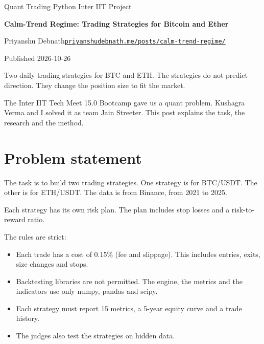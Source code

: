 \documentclass[11pt,a4paper]{article}
\begin{document}
\thispagestyle{plain}
\begin{flushleft}
{\footnotesize\ttfamily\color{muted} Quant \textperiodcentered{} Trading \textperiodcentered{} Python \textperiodcentered{} Inter IIT \textperiodcentered{} Project}\par\smallskip
{\LARGE\bfseries\color{ink} Calm-Trend Regime: Trading Strategies for Bitcoin and Ether\par}
\medskip
{\small Priyanshu Debnath\quad\textperiodcentered\quad \href{https://priyanshudebnath.me/posts/calm-trend-regime/}{\texttt{priyanshudebnath.me/posts/calm-trend-regime/}}}\par
{\small\color{muted} Published 2026-10-26}\par
\end{flushleft}
\begin{quotebox}
Two daily trading strategies for BTC and ETH. The strategies do not predict direction. They change the position size to fit the market.
\end{quotebox}
\noindent{\color{rule}\rule{\linewidth}{0.5pt}}

The Inter IIT Tech Meet 15.0 Bootcamp gave us a quant problem. Kushagra Verma and I solved it as team Jain Streeter. This post explains the task, the research and the method.

\section{Problem statement}

The task is to build two trading strategies. One strategy is for BTC/USDT. The other is for ETH/USDT. The data is from Binance, from 2021 to 2025.

Each strategy has its own risk plan. The plan includes stop losses and a risk-to-reward ratio.

The rules are strict:

\begin{itemize}
\item Each trade has a cost of 0.15\% (fee and slippage). This includes entries, exits, size changes and stops.
\item Backtesting libraries are not permitted. The engine, the metrics and the indicators use only numpy, pandas and scipy.
\item Each strategy must report 15 metrics, a 5-year equity curve and a trade history.
\item The judges also test the strategies on hidden data.
\end{itemize}
\end{document}
